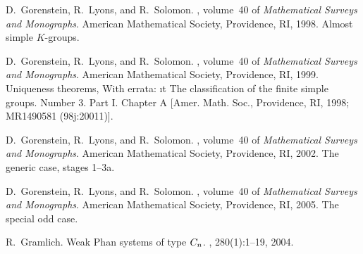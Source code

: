 \documentclass[12pt]{amsart}
\theoremstyle{definition}
\begin{document}
\begin{thebibliography}{10}
D.~Gorenstein, R.~Lyons, and R.~Solomon.
, volume~40 of {\em Mathematical Surveys and
  Monographs}.
\newblock American Mathematical Society, Providence, RI, 1998.
\newblock Almost simple $K$-groups.

D.~Gorenstein, R.~Lyons, and R.~Solomon.
, volume~40 of {\em Mathematical Surveys and
  Monographs}.
\newblock American Mathematical Society, Providence, RI, 1999.
\newblock Uniqueness theorems, With errata: {{\i}t The classification of the
  finite simple groups. Number 3. Part I. Chapter A} [Amer. Math. Soc.,
  Providence, RI, 1998; MR1490581 (98j:20011)].

D.~Gorenstein, R.~Lyons, and R.~Solomon.
, volume~40 of {\em Mathematical Surveys and
  Monographs}.
\newblock American Mathematical Society, Providence, RI, 2002.
\newblock The generic case, stages 1--3a.

D.~Gorenstein, R.~Lyons, and R.~Solomon.
, volume~40 of {\em Mathematical Surveys and Monographs}.
\newblock American Mathematical Society, Providence, RI, 2005.
\newblock The special odd case.

R.~Gramlich.
\newblock Weak {P}han systems of type {$C\sb n$}.
, 280(1):1--19, 2004.





%
%


\end{thebibliography}
\end{document}
